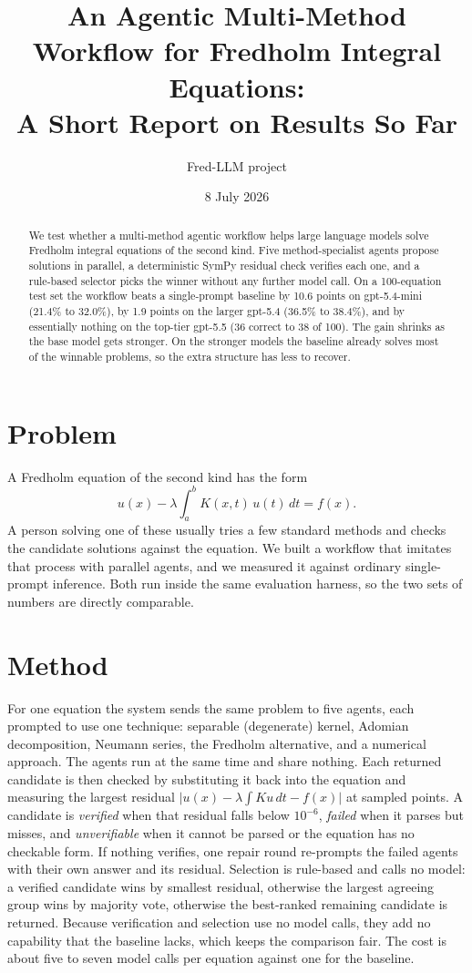 \documentclass[11pt]{article}
\title{An Agentic Multi-Method Workflow for Fredholm Integral Equations:\\
\large A Short Report on Results So Far}
\author{Fred-LLM project}
\date{8 July 2026}
\begin{document}
\maketitle

\begin{abstract}
\noindent
We test whether a multi-method agentic workflow helps large language models
solve Fredholm integral equations of the second kind. Five method-specialist
agents propose solutions in parallel, a deterministic SymPy residual check
verifies each one, and a rule-based selector picks the winner without any
further model call. On a 100-equation test set the workflow beats a
single-prompt baseline by 10.6 points on gpt-5.4-mini (21.4\% to 32.0\%), by
1.9 points on the larger gpt-5.4 (36.5\% to 38.4\%), and by essentially nothing
on the top-tier gpt-5.5 (36 correct to 38 of 100). The gain shrinks as the base
model gets stronger. On the stronger models the baseline already solves most of
the winnable problems, so the extra structure has less to recover.
\end{abstract}

\section{Problem}
A Fredholm equation of the second kind has the form
\[
u(x) - \lambda \int_a^b K(x,t)\,u(t)\,dt = f(x).
\]
A person solving one of these usually tries a few standard methods and checks
the candidate solutions against the equation. We built a workflow that imitates
that process with parallel agents, and we measured it against ordinary
single-prompt inference. Both run inside the same evaluation harness, so the two
sets of numbers are directly comparable.

\section{Method}
For one equation the system sends the same problem to five agents, each prompted
to use one technique: separable (degenerate) kernel, Adomian decomposition,
Neumann series, the Fredholm alternative, and a numerical approach. The agents
run at the same time and share nothing. Each returned candidate is then checked
by substituting it back into the equation and measuring the largest residual
$\lvert u(x) - \lambda\int K u\,dt - f(x)\rvert$ at sampled points. A candidate
is \emph{verified} when that residual falls below $10^{-6}$, \emph{failed} when
it parses but misses, and \emph{unverifiable} when it cannot be parsed or the
equation has no checkable form. If nothing verifies, one repair round re-prompts
the failed agents with their own answer and its residual. Selection is
rule-based and calls no model: a verified candidate wins by smallest residual,
otherwise the largest agreeing group wins by majority vote, otherwise the
best-ranked remaining candidate is returned. Because verification and selection
use no model calls, they add no capability that the baseline lacks, which keeps
the comparison fair. The cost is about five to seven model calls per equation
against one for the baseline.
\end{document}
